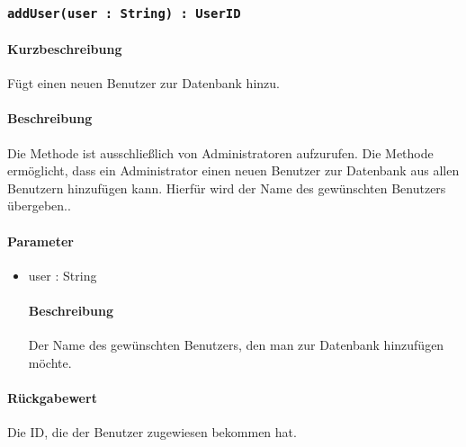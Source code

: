 \subsubsection{\texttt{addUser(user : String) : UserID}}%
\paragraph*{Kurzbeschreibung}
Fügt einen neuen Benutzer zur Datenbank hinzu.
\paragraph*{Beschreibung}
Die Methode ist ausschließlich von Administratoren aufzurufen.
Die Methode ermöglicht, dass ein Administrator einen neuen Benutzer zur Datenbank aus allen Benutzern hinzufügen kann.
Hierfür wird der Name des gewünschten Benutzers übergeben..
\paragraph*{Parameter}
\begin{itemize}
    \item user : String
    		\paragraph*{Beschreibung}
    		Der Name des gewünschten Benutzers, den man zur Datenbank hinzufügen möchte.
\end{itemize}
\paragraph*{Rückgabewert}
Die ID, die der Benutzer zugewiesen bekommen hat.
